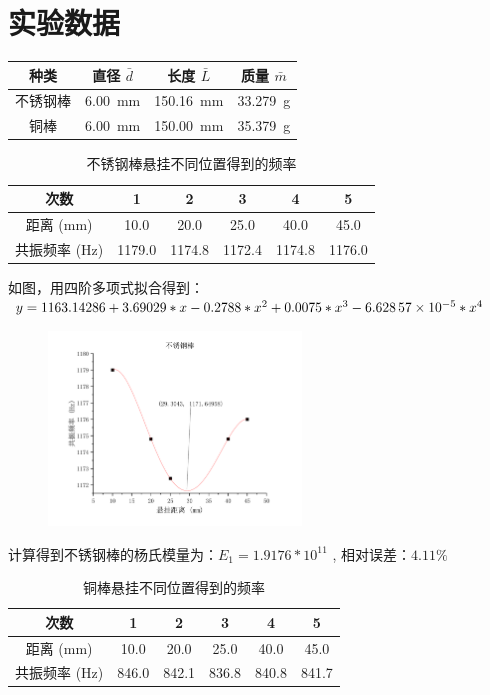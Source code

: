 \documentclass[a4paper,utf8]{article}
\begin{document}
\section{实验数据}
    \begin{table}[!ht]
        \centering\begin{tabular}{c c c c}\hline
            种类 & 直径 $\bar{d}$ & 长度 $\bar{L}$ & 质量 $\bar{m}$\\ \hline
            不锈钢棒 & \SI{6.00}{\mm} & \SI{150.16}{\mm} & \SI{33.279}{\g} \\ 
            铜棒 & \SI{6.00}{\mm} & \SI{150.00}{\mm} & \SI{35.379}{\g} \\ \hline
        \end{tabular}
    \end{table}\par
    \begin{table}[!ht]
        \caption{不锈钢棒悬挂不同位置得到的频率}
        \centering\begin{tabular}{c c c c c c}\hline
            次数 & 1 & 2 & 3 & 4 & 5\\ \hline
            距离 (mm) & 10.0 & 20.0 & 25.0 & 40.0 & 45.0 \\ 
            共振频率 (Hz) & 1179.0 & 1174.8 & 1172.4 & 1174.8 & 1176.0\\ \hline
        \end{tabular}
    \end{table}\par
    如图，用四阶多项式拟合得到：$ y =  1163.14286 + 3.69029 * x  -0.2788 * x^2 + 0.0075 * x^3 - \num{6.62857E-5} *x^4 $ \par
    \begin{figure}[!ht]
        \includegraphics[width=0.6\textwidth]{fig1.pdf}
    \end{figure}\par
    计算得到不锈钢棒的杨氏模量为：$E_1=1.9176*10^{11}$ , $\text{相对误差：} 4.11 \%$
    \begin{table}[!ht]
        \caption{铜棒悬挂不同位置得到的频率}
        \centering\begin{tabular}{c c c c c c}\hline
            次数 & 1 & 2 & 3 & 4 & 5\\ \hline
            距离 (mm) & 10.0 & 20.0 & 25.0 & 40.0 & 45.0 \\ 
            共振频率 (Hz) & 846.0 & 842.1 & 836.8 & 840.8 & 841.7 \\ \hline
        \end{tabular}
    \end{table}\par
\end{document}
